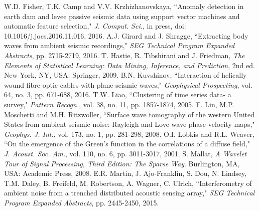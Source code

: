 \documentclass[11pt]{article}
\begin{document}
\begin{thebibliography}{30}
 W.D. Fisher, T.K. Camp and V.V. Krzhizhanovskaya, ``Anomaly detection in earth dam and levee passive seismic data using support vector machines and automatic feature selection," \textit{J. Comput. Sci.}, in press, doi: 10.1016/j.jocs.2016.11.016, 2016.
\vspace{-0.2cm}
 A.J. Girard and J. Shragge, ``Extracting body waves from ambient seismic recordings," \textit{SEG Technical Program Expanded Abstracts}, pp. 2715-2719, 2016.
\vspace{-0.2cm}
 T. Hastie, R. Tibshirani and J. Friedman, \textit{The Elements of Statistical Learning: Data Mining, Inference, and Prediction}, 2nd ed. New York, NY, USA: Springer, 2009.
\vspace{-0.2cm}
 B.N. Kuvshinov, ``Interaction of helically wound fibre-optic cables with plane seismic waves," \textit{Geophysical Prospecting}, vol. 64, no. 3, pp. 671-688, 2016.
\vspace{-0.2cm}
 T.W. Liao, ``Clustering of time series data- a survey," \textit{Pattern Recogn.}, vol. 38, no. 11, pp. 1857-1874, 2005.
\vspace{-0.2cm}
 F. Lin, M.P. Moschetti and M.H. Ritzwoller, ``Surface wave tomography of the western United States from ambient seismic noise: Rayleigh and Love wave phase velocity maps," \textit{Geophys. J. Int.}, vol. 173, no. 1, pp. 281-298, 2008.
\vspace{-0.2cm}
 O.I. Lobkis and R.L. Weaver, ``On the emergence of the Green's function in the correlations of a diffuse field," \textit{J. Acoust. Soc. Am.}, vol. 110, no. 6, pp. 3011-3017, 2001.
\vspace{-0.2cm}
 S. Mallat, \textit{A Wavelet Tour of Signal Processing, Third Edition: The Sparse Way}. Burlington, MA, USA: Academic Press, 2008.
\vspace{-0.2cm}
 E.R. Martin, J. Ajo-Franklin, S. Dou, N. Lindsey, T.M. Daley, B. Freifeld, M. Robertson, A. Wagner, C. Ulrich, ``Interferometry of ambient noise from a trenched distributed acoustic sensing array," \textit{SEG Technical Program Expanded Abstracts}, pp. 2445-2450, 2015.

\end{thebibliography}
\end{document}
